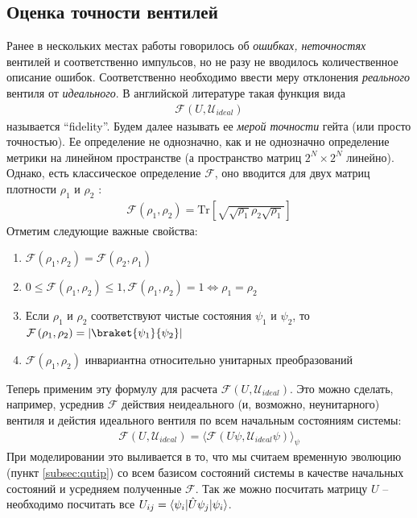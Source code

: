 \documentclass[12pt, twoside]{report}
\newcommand{\Tr}[1]{\text{Tr}\left[#1\right]}
\DeclarePairedDelimiter\bra{\langle}{\rvert}
\DeclarePairedDelimiter\ket{\lvert}{\rangle}
\numberwithin{equation}{section}
\numberwithin{figure}{section}
\begin{document}
\subsection{Оценка точности вентилей}
Ранее в нескольких местах работы говорилось об \textit{ошибках, неточностях} вентилей и соответственно импульсов, но не разу не вводилось количественное описание ошибок. Соответственно необходимо ввести меру отклонения \textit{реального} вентиля от \textit{идеального}. В английской литературе такая функция вида
\begin{gather*}
\mathcal{F} \left(U, \mathcal{U}_{ideal}\right)
\end{gather*}
называется ``fidelity''. Будем далее называть ее \textit{мерой точности} гейта (или просто точностью). Ее определение не однозначно, как и не однозначно определение метрики на линейном пространстве (а пространство матриц $2^N \times 2^N$ линейно). Однако, есть классическое определение $\mathcal{F}$, оно вводится для двух матриц плотности $\rho_1$ и $\rho_2$ \cite{JozsaFidelity} : 
\begin{gather*}
\mathcal{F} \left(\rho_1, \rho_2\right) = \Tr{ \sqrt{\sqrt{\rho_1} \rho_2 \sqrt{\rho_1} } }
\label{eq:fidelity-definition}
\end{gather*}
Отметим следующие важные свойства:
\begin{enumerate}
	\item $\mathcal{F} \left(\rho_1, \rho_2\right) = \mathcal{F} \left(\rho_2, \rho_1\right)$
	\item $0 \leq \mathcal{F} \left(\rho_1, \rho_2\right) \leq 1, \mathcal{F} \left(\rho_1, \rho_2\right) = 1 \Leftrightarrow \rho_1 = \rho_2$
	\item Если $\rho_1$ и $\rho_2$ соответствуют чистые состояния $\psi_1$ и $\psi_2$, то $\mathcal{F} \left(\rho_1, \rho_2\right) = \left| \braket{\psi_1}{\psi_2} \right|$
	\item $\mathcal{F} \left(\rho_1, \rho_2\right)$ инвариантна относительно унитарных преобразований
\end{enumerate}
Теперь применим эту формулу для расчета $\mathcal{F} \left(U, \mathcal{U}_{ideal}\right)
$. Это можно сделать, например, усреднив $\mathcal{F}$ действия неидеального (и, возможно, неунитарного) вентиля и дейстия идеального вентиля по всем начальным состояниям системы:
\begin{gather}
\mathcal{F} \left(U, \mathcal{U}_{ideal}\right) = \langle \mathcal{F} \left(U\psi, \mathcal{U}_{ideal}\psi\right) \rangle_\psi
\label{eq:gate-fidelity-definition}
\end{gather}
При моделировании это выливается в то, что мы считаем временную эволюцию (пункт \ref{subsec:qutip}) со всем базисом состояний системы в качестве начальных состояний и усредняем полученные $\mathcal{F}$. Так же можно посчитать матрицу $U$ -- необходимо посчитать все $U_{ij} = \bra{\psi_i} \hat U \psi_j \ket{\psi_i}$.
\end{document}
